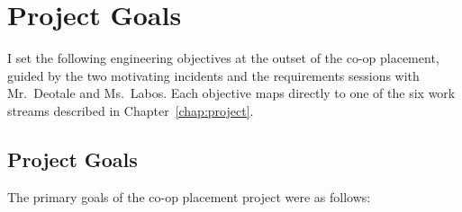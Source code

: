 ﻿%

\chapter{Project Goals}
\label{chap:project_goals}

I set the following engineering objectives at the outset of the co-op placement,
guided by the two motivating incidents and the requirements sessions with
Mr.\ Deotale and Ms.\ Labos. Each objective maps directly to one of the six work streams
described in Chapter~\ref{chap:project}.


\FloatBarrier

\section{Project Goals}
\label{sec:project_goals}


The primary goals of the co-op placement project were as follows:

